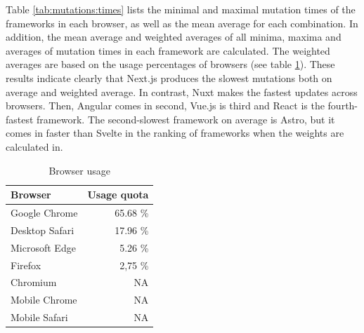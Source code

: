 \documentclass[a4paper, 12pt]{article}
\begin{document}
Table \ref{tab:mutations:times} lists the minimal and maximal mutation times of the frameworks in each browser, as well as the mean average for each combination.
In addition, the mean average and weighted averages of all minima, maxima and averages of mutation times in each framework are calculated.
The weighted averages are based on the usage percentages of browsers (see table \ref{tab:browserUsage}).
These results indicate clearly that Next.js produces the slowest mutations both on average and weighted average.
In contrast, Nuxt makes the fastest updates across browsers.
Then, Angular comes in second, Vue.js is third and React is the fourth-fastest framework.
The second-slowest framework on average is Astro, but it comes in faster than Svelte in the ranking of frameworks when the weights are calculated in.


\begin{table}[!h]
  \centering
  \begin{tabular}{|l|r|}
    \hline
    \textbf{Browser}  & \textbf{Usage quota} \\ \hline
    Google Chrome     & 65.68 \% \\ \hline
    Desktop Safari    & 17.96 \% \\ \hline
    Microsoft Edge    & 5.26 \% \\ \hline
    Firefox           & 2,75 \% \\ \hline
    Chromium          & NA \\ \hline
    Mobile Chrome     & NA \\ \hline
    Mobile Safari     & NA \\ \hline
  \end{tabular}
  \caption{Browser usage \citep{browserUsage}}
  \label{tab:browserUsage}
\end{table}

\pagebreak
\end{document}
